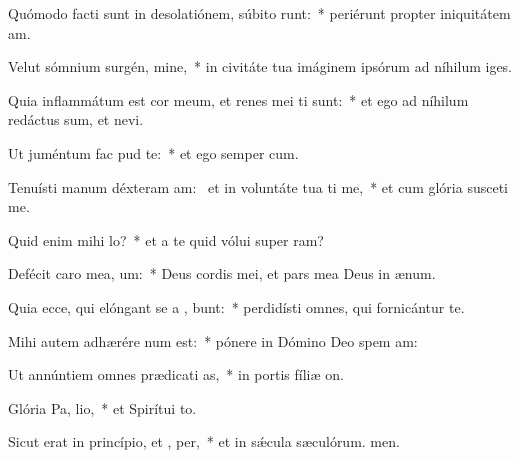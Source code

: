 \item Quómodo facti sunt in desolatiónem, súbito runt:~* periérunt propter iniquitátem am.
\item Velut sómnium surgén, mine,~* in civitáte tua imáginem ipsórum ad níhilum iges.
\item Quia inflammátum est cor meum, et renes mei ti sunt:~* et ego ad níhilum redáctus sum, et nevi.
\item Ut juméntum fac  pud te:~* et ego semper cum.
\item Tenuísti manum déxteram am:~\pscross{} et in voluntáte tua ti me,~* et cum glória susceti me.
\item Quid enim mihi   lo?~* et a te quid vólui super ram?
\item Defécit caro mea,   um:~* Deus cordis mei, et pars mea Deus in ænum.
\item Quia ecce, qui elóngant se a , bunt:~* perdidísti omnes, qui fornicántur  te.
\item Mihi autem adhærére  num est:~* pónere in Dómino Deo spem am:
\item Ut annúntiem omnes prædicati as,~* in portis fíliæ on.
\item Glória Pa,  lio,~* et Spirítui to.
\item Sicut erat in princípio, et ,  per,~* et in sǽcula sæculórum. men.

